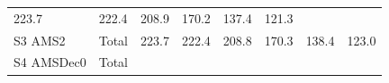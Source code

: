\documentclass[]{article}
\begin{document}
\begin{longtable}[]{@{}llrrrrrr@{}}
\begin{minipage}[t]{0.09\columnwidth}
223.7\strut
\end{minipage} & \begin{minipage}[t]{0.09\columnwidth}\raggedleft\strut
222.4\strut
\end{minipage} & \begin{minipage}[t]{0.09\columnwidth}\raggedleft\strut
208.9\strut
\end{minipage} & \begin{minipage}[t]{0.09\columnwidth}\raggedleft\strut
170.2\strut
\end{minipage} & \begin{minipage}[t]{0.09\columnwidth}\raggedleft\strut
137.4\strut
\end{minipage} & \begin{minipage}[t]{0.09\columnwidth}\raggedleft\strut
121.3\strut
\end{minipage}\tabularnewline
\begin{minipage}[t]{0.14\columnwidth}\raggedright\strut
S3 AMS2\strut
\end{minipage} & \begin{minipage}[t]{0.13\columnwidth}\raggedright\strut
Total\strut
\end{minipage} & \begin{minipage}[t]{0.09\columnwidth}\raggedleft\strut
223.7\strut
\end{minipage} & \begin{minipage}[t]{0.09\columnwidth}\raggedleft\strut
222.4\strut
\end{minipage} & \begin{minipage}[t]{0.09\columnwidth}\raggedleft\strut
208.8\strut
\end{minipage} & \begin{minipage}[t]{0.09\columnwidth}\raggedleft\strut
170.3\strut
\end{minipage} & \begin{minipage}[t]{0.09\columnwidth}\raggedleft\strut
138.4\strut
\end{minipage} & \begin{minipage}[t]{0.09\columnwidth}\raggedleft\strut
123.0\strut
\end{minipage}\tabularnewline
\begin{minipage}[t]{0.14\columnwidth}\raggedright\strut
S4 AMSDec0\strut
\end{minipage} & \begin{minipage}[t]{0.13\columnwidth}\raggedright\strut
Total\strut
\end{minipage} & \begin{minipage}[t]{0.09\columnwidth}\raggedleft\strut

\end{minipage}
\end{longtable}
\end{document}
